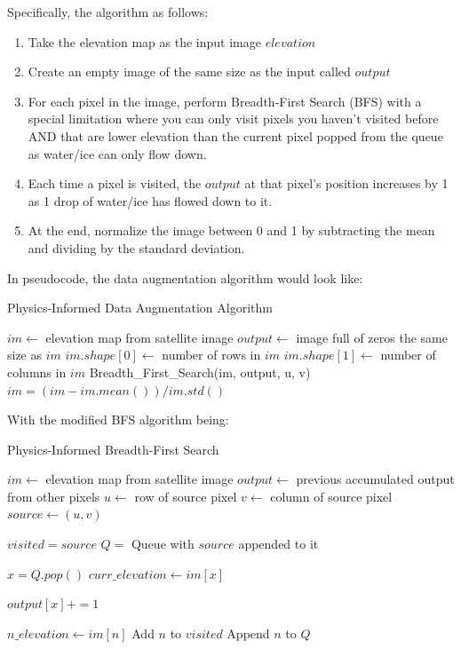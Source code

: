 Specifically, the algorithm as follows:
\begin{enumerate}
    \item Take the elevation map as the input image $elevation$
    \item Create an empty image of the same size as the input called $output$
    \item For each pixel in the image, perform Breadth-First Search (BFS) with a special limitation where you can only visit pixels you haven't visited before AND that are lower elevation than the current pixel popped from the queue as water/ice can only flow down.
    \item Each time a pixel is visited, the $output$ at that pixel's position increases by 1 as 1 drop of water/ice has flowed down to it.
    \item At the end, normalize the image between 0 and 1 by subtracting the mean and dividing by the standard deviation.
\end{enumerate}

In pseudocode, the data augmentation algorithm would look like:
\begin{algorithm}[H]
    \caption{Physics-Informed Data Augmentation Algorithm}
    \begin{algorithmic}
        \State $im \gets$ elevation map from satellite image
        \State $output \gets $ image full of zeros the same size as $im$
        \State $im.shape[0] \gets$ number of rows in $im$
        \State $im.shape[1] \gets$ number of columns in $im$
                \State Breadth\_First\_Search(im, output, u, v)
            \EndFor
        \EndFor
        \State $im = (im - im.mean()) / im.std()$
    \end{algorithmic}
\end{algorithm}

With the modified BFS algorithm being:
\begin{algorithm}[H]
    \caption{Physics-Informed Breadth-First Search}
    \begin{algorithmic}
        \State $im \gets$ elevation map from satellite image
        \State $output \gets$ previous accumulated output from other pixels
        \State $u \gets$ row of source pixel
        \State $v \gets$ column of source pixel
        \State $source \gets (u, v)$

        \State $visited = {source}$
        \State $Q = $ Queue with $source$ appended to it

            \State $x = Q.pop()$
            \State $curr\_elevation \gets im[x]$

                \State $output[x] += 1$
            \EndIf

                \State $n\_elevation \gets im[n]$
                    \State Add $n$ to $visited$
                    \State Append $n$ to $Q$
                \EndIf
            \EndFor
        \EndWhile
    \end{algorithmic}
\end{algorithm}

